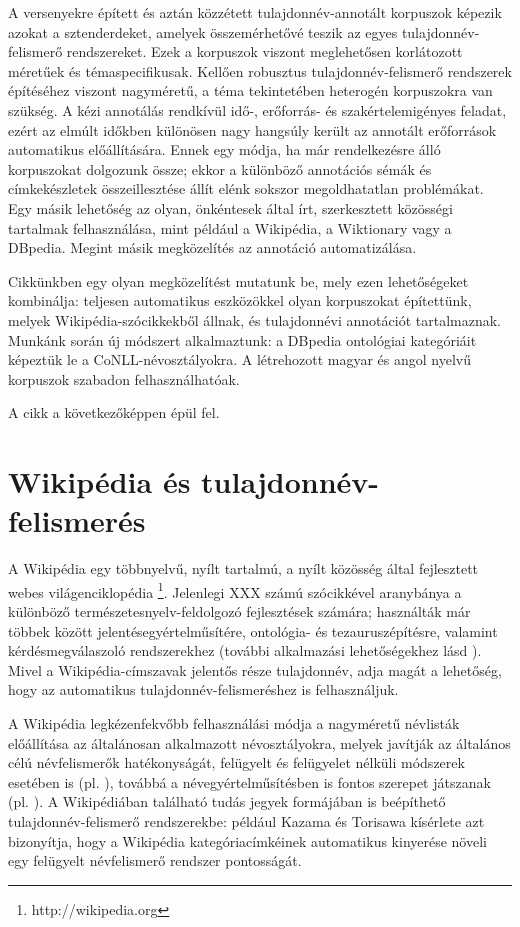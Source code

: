\documentclass{llncs}
\begin{document}
A versenyekre épített és aztán közzétett tulajdonnév-annotált korpuszok képezik azokat a sztenderdeket, amelyek összemérhetővé teszik az egyes tulajdonnév-felismerő rendszereket. Ezek a korpuszok viszont meglehetősen korlátozott méretűek és témaspecifikusak. Kellően robusztus tulajdonnév-felismerő rendszerek építéséhez viszont nagyméretű, a téma tekintetében heterogén korpuszokra van szükség. A kézi annotálás rendkívül idő-, erőforrás- és szakértelemigényes feladat, ezért az elmúlt időkben különösen nagy hangsúly került az annotált erőforrások automatikus előállítására. Ennek egy módja, ha már rendelkezésre álló korpuszokat dolgozunk össze; ekkor a különböző annotációs sémák és címkekészletek összeillesztése állít elénk sokszor megoldhatatlan problémákat. Egy másik lehetőség az olyan, önkéntesek által írt, szerkesztett közösségi tartalmak felhasználása, mint például a Wikipédia, a Wiktionary vagy a DBpedia. Megint másik megközelítés az annotáció automatizálása. 

Cikkünkben egy olyan megközelítést mutatunk be, mely ezen lehetőségeket kombinálja: teljesen automatikus eszközökkel olyan korpuszokat építettünk, melyek Wikipédia-szócikkekből állnak, és tulajdonnévi annotációt tartalmaznak. Munkánk során új módszert alkalmaztunk: a DBpedia ontológiai kategóriáit képeztük le a CoNLL-névosztályokra. A létrehozott magyar és angol nyelvű korpuszok szabadon felhasználhatóak. 

A cikk a következőképpen épül fel. %


\section{Wikipédia és tulajdonnév-felismerés}

A Wikipédia egy többnyelvű, nyílt tartalmú, a nyílt közösség által fejlesztett webes világenciklopédia \footnote{http://wikipedia.org}. Jelenlegi XXX számú szócikkével aranybánya a különböző természetesnyelv-feldolgozó fejlesztések számára; használták már többek között jelentésegyértelműsítére, ontológia- és tezauruszépítésre, valamint kérdésmegválaszoló rendszerekhez (további alkalmazási lehetőségekhez lásd \cite{Medelyan}). Mivel a Wikipédia-címszavak jelentős része tulajdonnév, adja magát a lehetőség, hogy az automatikus tulajdonnév-felismeréshez is felhasználjuk. 

A Wikipédia legkézenfekvőbb felhasználási módja a nagyméretű névlisták előállítása az általánosan alkalmazott névosztályokra, melyek javítják az általános célú névfelismerők hatékonyságát, felügyelt és felügyelet nélküli módszerek esetében is (pl. \cite{Toral:Munoz, Nadeau}), továbbá a névegyértelműsítésben is fontos szerepet játszanak (pl. \cite{Bunescu:Pasca}). A Wikipédiában található tudás jegyek formájában is beépíthető tulajdonnév-felismerő rendszerekbe: például Kazama és Torisawa \cite{KaTo} kísérlete azt bizonyítja, hogy a Wikipédia kategóriacímkéinek automatikus kinyerése növeli egy felügyelt névfelismerő rendszer pontosságát. 
\end{document}
